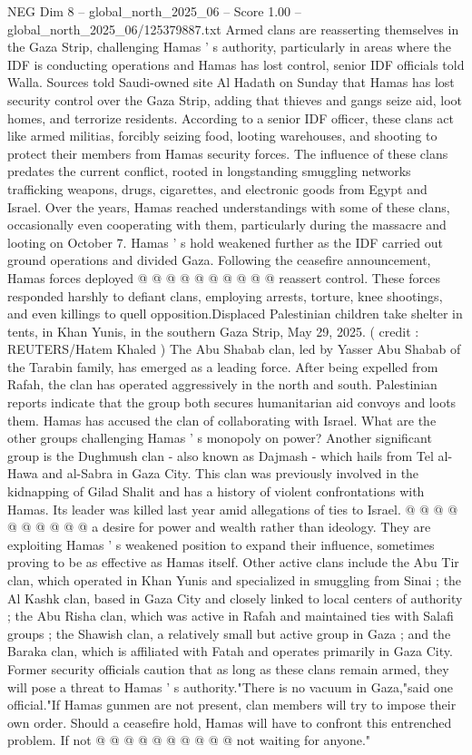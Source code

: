 \begin{textsample}{NEG Dim 8 – global\_north\_2025\_06 – Score 1.00 – global\_north\_2025\_06/125379887.txt}  \label{ex:f8_neg_404}
Armed clans are reasserting themselves in the Gaza Strip, challenging Hamas ' s authority, particularly in areas where the IDF is conducting operations and Hamas has lost control, senior IDF officials told Walla.
Sources told Saudi-owned site Al Hadath on Sunday that Hamas has lost security control over the Gaza Strip, adding that thieves and gangs seize aid, loot homes, and terrorize residents.
According to a senior IDF officer, these clans act like armed militias, forcibly seizing food, looting warehouses, and shooting to protect their members from Hamas security forces.
The influence of these clans predates the current conflict, rooted in longstanding smuggling networks trafficking weapons, drugs, cigarettes, and electronic goods from Egypt and Israel.
Over the years, Hamas reached understandings with some of these clans, occasionally even cooperating with them, particularly during the massacre and looting on October 7.
Hamas ' s hold weakened further as the IDF carried out ground operations and divided Gaza.
Following the ceasefire announcement, Hamas forces deployed @ @ @ @ @ @ @ @ @ @ reassert control.
These forces responded harshly to defiant clans, employing arrests, torture, knee shootings, and even killings to quell opposition.Displaced Palestinian children take shelter in tents, in Khan Yunis, in the southern Gaza Strip, May 29, 2025. ( credit : REUTERS/Hatem Khaled ) The Abu Shabab clan, led by Yasser Abu Shabab of the Tarabin family, has emerged as a leading force.
After being expelled from Rafah, the clan has operated aggressively in the north and south.
Palestinian reports indicate that the group both secures humanitarian aid convoys and loots them.
Hamas has accused the clan of collaborating with Israel.
What are the other groups challenging Hamas ' s monopoly on power?
Another significant group is the Dughmush clan - also known as Dajmash - which hails from Tel al-Hawa and al-Sabra in Gaza City.
This clan was previously involved in the kidnapping of Gilad Shalit and has a history of violent confrontations with Hamas.
Its leader was killed last year amid allegations of ties to Israel. @ @ @ @ @ @ @ @ @ @ a desire for power and wealth rather than ideology.
They are exploiting Hamas ' s weakened position to expand their influence, sometimes proving to be as effective as Hamas itself.
Other active clans include the Abu Tir clan, which operated in Khan Yunis and specialized in smuggling from Sinai ; the Al Kashk clan, based in Gaza City and closely linked to local centers of authority ; the Abu Risha clan, which was active in Rafah and maintained ties with Salafi groups ; the Shawish clan, a relatively small but active group in Gaza ; and the Baraka clan, which is affiliated with Fatah and operates primarily in Gaza City.
Former security officials caution that as long as these clans remain armed, they will pose a threat to Hamas ' s authority."There is no vacuum in Gaza,"said one official."If Hamas gunmen are not present, clan members will try to impose their own order.
Should a ceasefire hold, Hamas will have to confront this entrenched problem.
If not @ @ @ @ @ @ @ @ @ @ not waiting for anyone."

\end{textsample}
